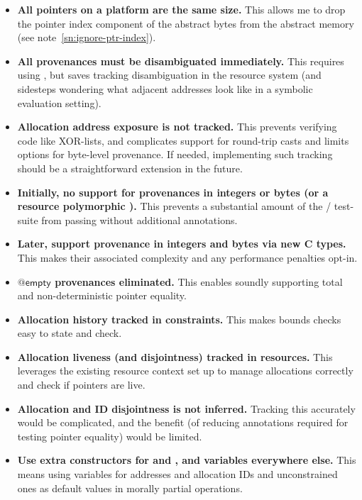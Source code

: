 \begin{itemize}
    \item \textbf{All pointers on a platform are the same size.} This
        allows me to drop the pointer index component of the abstract bytes
        from the abstract memory (see note~\ref{sn:ignore-ptr-index}).
    \item \textbf{All provenances must be disambiguated immediately.} This
        requires using , but saves tracking
        disambiguation in the resource system (and sidesteps wondering what
        adjacent addresses look like in a symbolic evaluation setting).
    \item \textbf{Allocation address exposure is not tracked.} This prevents
        verifying code like XOR-lists, and complicates support for round-trip
        casts and limits options for byte-level provenance. If needed,
        implementing such tracking should be a straightforward extension in the
        future.
    \item \textbf{Initially, no support for provenances in integers or bytes
        (or a resource polymorphic ).}
        This prevents a substantial amount of the /
        test-suite from passing without additional annotations.
    \item \textbf{Later, support provenance in integers and bytes via new C
        types.} This makes their associated complexity and any performance
        penalties opt-in.
    \item \textbf{$@\mathsf{empty}$ provenances eliminated.} This enables
        soundly supporting total and non-deterministic pointer equality.
    \item \textbf{Allocation history tracked in constraints.} This makes
        bounds checks easy to state and check.
    \item \textbf{Allocation liveness (and disjointness) tracked in
        resources.} This leverages the existing resource context set up
        to manage allocations correctly and check if pointers are live.
    \item \textbf{Allocation and ID disjointness is not inferred.} Tracking
        this accurately would be complicated, and the benefit (of reducing
        annotations required for testing pointer equality) would be limited.
    \item \textbf{Use extra constructors for  and
        , and variables everywhere else.} This means using
        variables for addresses and allocation IDs and unconstrained ones as
        default values in morally partial operations.
\end{itemize}
